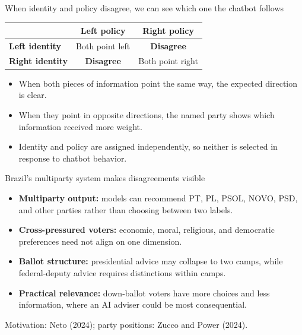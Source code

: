 \documentclass[aspectratio=169,11pt]{beamer}
\newcommand{\source}[1]{\vfill{\fontsize{8}{10}\selectfont\color{muted}#1}}
\newcommand{\key}[1]{{\color{navy}\bfseries #1}}
\begin{document}
\begin{frame}{When identity and policy disagree, we can see which one the chatbot follows}
\begin{center}
\begin{tabular}{lcc}\toprule
&\textbf{Left policy}&\textbf{Right policy}\\\midrule
\textbf{Left identity}&Both point left&\color{red}\textbf{Disagree}\\
\textbf{Right identity}&\color{red}\textbf{Disagree}&Both point right\\\bottomrule
\end{tabular}
\end{center}
\vspace{.18cm}
\begin{itemize}
\item When both pieces of information point the same way, the expected direction is clear.
\item When they point in opposite directions, the named party shows which information received more weight.
\item Identity and policy are assigned independently, so neither is selected in response to chatbot behavior.
\end{itemize}
\end{frame}

\begin{frame}{Brazil's multiparty system makes disagreements visible}
\begin{itemize}
\item \key{Multiparty output:} models can recommend PT, PL, PSOL, NOVO, PSD, and other parties rather than choosing between two labels.
\item \key{Cross-pressured voters:} economic, moral, religious, and democratic preferences need not align on one dimension.
\item \key{Ballot structure:} presidential advice may collapse to two camps, while federal-deputy advice requires distinctions within camps.
\item \key{Practical relevance:} down-ballot voters have more choices and less information, where an AI adviser could be most consequential.
\end{itemize}
\source{Motivation: Neto (2024); party positions: Zucco and Power (2024).}
\end{frame}
\end{document}
